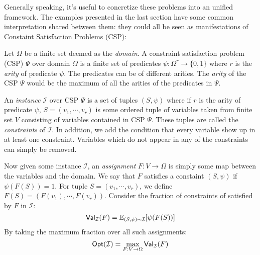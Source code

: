  Generally speaking, it's useful to concretize these problems into an unified framework. The examples presented in the last section have some common interpretation shared between them: they could all be seen as manifestations of Constaint Satisfaction Problems (CSP):
%
\begin{definition}
  Let $\Omega$ be a finite set deemed as the \emph{domain}. A constraint satisfaction problem (CSP) $\Psi$ over domain $\Omega$ is a finite set of predicates $\psi:\Omega^r \rightarrow \{0,1\}$ where $r$ is the \emph{arity} of predicate $\psi$. The predicates can be of different arities. The \emph{arity} of the CSP $\Psi$ would be the maximum of all the arities of the predicates in $\Psi$. \newline

  \noindent An \emph{instance} $\mathcal{I}$ over CSP $\Psi$ is a set of tuples $(S,\psi)$ where if $r$ is the arity of predicate $\psi$, $S = (v_1,\cdots,v_r)$ is some ordered tuple of variables taken from finite set $V$ consisting of variables contained in CSP $\Psi$. These tuples are called the \emph{constraints} of $\mathcal{I}$. In addition, we add the condition that every variable show up in at least one constraint. Variables which do not appear in any of the constraints can simply be removed. \newline

  \noindent Now given some instance $\mathcal{I}$, an \emph{assignment} $F:V \rightarrow \Omega$ is simply some  map between the variables and the domain. We say that $F$ satisfies a constaint $(S,\psi)$ if $\psi(F(S)) = 1$. For tuple $S = (v_1, \cdots, v_r)$, we define $F(S) = (F(v_1), \cdots, F(v_r))$. Consider the fraction of constraints of satisfied by $F$ in $\mathcal{I}$:
  \begin{equation}
  \mathsf{Val}_{\mathcal{I}}(F) = \mathbb{E}_{(S, \psi) \sim \mathcal{I}}[\psi(F(S))]
  \end{equation}
  By taking the maximum fraction over all such assignments:
  \begin{equation}
  \mathsf{Opt}(\mathcal{I}) = \max_{F: V \rightarrow \Omega} \mathsf{Val}_{\mathcal{I}}(F)
  \end{equation}
\end{definition}

